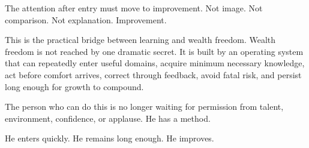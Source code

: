 The attention after entry must move to improvement. Not image. Not comparison. Not explanation. Improvement.

This is the practical bridge between learning and wealth freedom. Wealth freedom is not reached by one dramatic secret. It is built by an operating system that can repeatedly enter useful domains, acquire minimum necessary knowledge, act before comfort arrives, correct through feedback, avoid fatal risk, and persist long enough for growth to compound.

The person who can do this is no longer waiting for permission from talent, environment, confidence, or applause. He has a method.

He enters quickly. He remains long enough. He improves.
